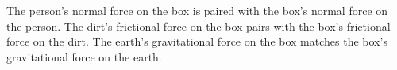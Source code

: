 The person's normal force on the box is paired with the
box's normal force on the person. The dirt's frictional
force on the box pairs with the box's frictional force on
the dirt. The earth's gravitational force on the box
matches the box's gravitational force on the earth.



